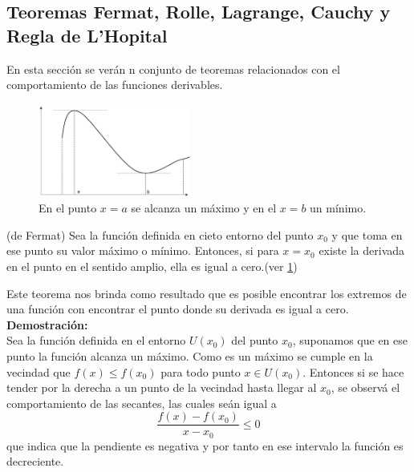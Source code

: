 \documentclass[10pt,twoside]{SelfArx} %
\begin{document}
  \subsection{Teoremas Fermat, Rolle, Lagrange, Cauchy y Regla de L'Hopital}
 En esta sección se verán n conjunto de teoremas relacionados con el comportamiento de las funciones derivables.
 \begin{figure}
 	\centering
 	\includegraphics[width=5cm]{fermat1}
 	\caption{En el punto $ x=a $ se alcanza un m\'aximo y en el $ x=b $ un m\'inimo.}
 	\label{fermat1}
 \end{figure}
 \begin{teorema}
 	(de Fermat)
 	Sea la función definida en cieto entorno del punto $ x_{0} $ y que toma en ese punto su valor máximo o mínimo. Entonces, si para $ x=x_{0} $ existe la derivada en el punto en el sentido amplio, ella es igual a cero.(ver \ref{fermat1})
 \end{teorema}
 Este teorema nos brinda como resultado que es posible encontrar los extremos de una función con encontrar el punto donde su derivada es igual a cero.\\
 \textbf{Demostración:}\\
 Sea la funci\'on definida en el entorno $ U(x_{0}) $ del punto $ x_{0} $, suponamos que en ese punto la funci\'on alcanza un m\'aximo. 
 Como es un máximo se cumple en la vecindad que $ f(x)\leq f(x_{0}) $ para todo punto $ x\in U(x_{0}) $.
 Entonces si se hace tender por la derecha a un punto de la vecindad hasta llegar al $ x_{0} $, se observ\'a el comportamiento de las secantes, las cuales se\'an igual a 
 \begin{equation}
\dfrac{ f(x)-f(x_{0})}{x-x_{0}}\leq0
 \end{equation}
 que indica que la pendiente es negativa y por tanto en ese intervalo la funci\'on es decreciente.\\
\end{document}

